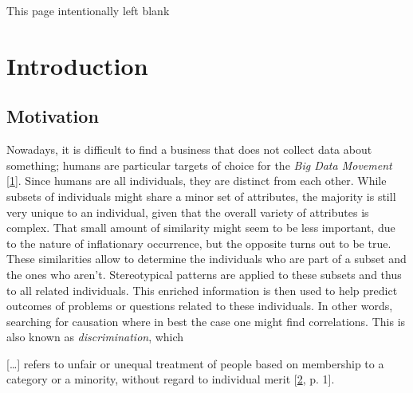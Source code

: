 \documentclass[12pt,english,a4paper,titlepage,cleardoublepage=empty,dottedtoc]{report}
\let\origquote\quote
\let\endorigquote\endquote
\renewenvironment{quote}{%
    \origquote
    \itshape
}
{\endorigquote}
\begin{document}
\begin{center}
\thispagestyle{empty}
\setcounter{page}{0}
This page intentionally left blank
\end{center}\newpage

\chapter{Introduction}\label{introduction}

\section{Motivation}\label{motivation}

Nowadays, it is difficult to find a business that does not collect data
about something; humans are particular targets of choice for the
\emph{Big Data Movement}
{[}\protect\hyperlink{ref-web_2016_privacy-international-about-big-data}{1}{]}.
Since humans are all individuals, they are distinct from each other.
While subsets of individuals might share a minor set of attributes, the
majority is still very unique to an individual, given that the overall
variety of attributes is complex. That small amount of similarity might
seem to be less important, due to the nature of inflationary occurrence,
but the opposite turns out to be true. These similarities allow to
determine the individuals who are part of a subset and the ones who
aren't. Stereotypical patterns are applied to these subsets and thus to
all related individuals. This enriched information is then used to help
predict outcomes of problems or questions related to these individuals.
In other words, searching for causation where in best the case one might
find correlations. This is also known as \emph{discrimination}, which

\begin{quote}
{[}\ldots{}{]} refers to unfair or unequal treatment of people based on
membership to a category or a minority, without regard to individual
merit
{[}\protect\hyperlink{ref-paper_2008_discrimination-aware-data-mining}{2},
p. 1{]}.
\end{quote}
\end{document}
